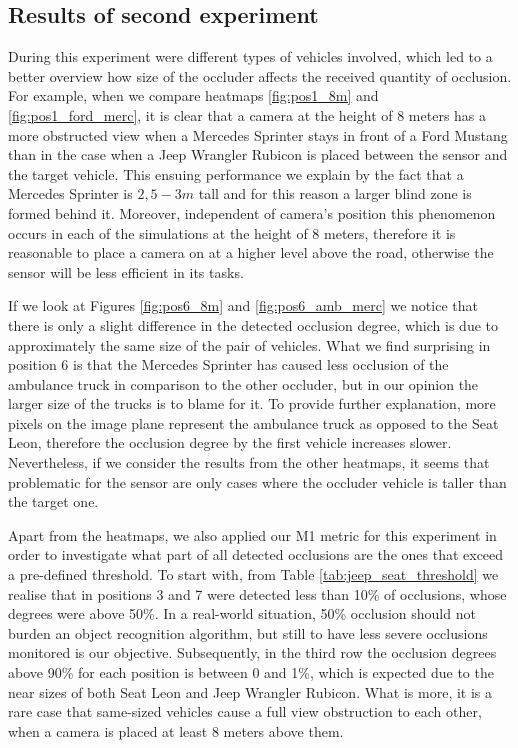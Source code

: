 \subsection{Results of second experiment}
During this experiment were different types of vehicles involved, which led to a better overview how size of the occluder affects the received quantity of occlusion. For example, when we compare heatmaps \ref{fig:pos1_8m} and \ref{fig:pos1_ford_merc}, it is clear that a camera at the height of 8 meters has a more obstructed view when a Mercedes Sprinter stays in front of a Ford Mustang than in the case when a Jeep Wrangler Rubicon is placed between the sensor and the target vehicle. This ensuing performance we explain by the fact that a Mercedes Sprinter is $2,5-3 m$ tall and for this reason a larger blind zone is formed behind it. Moreover, independent of camera's position this phenomenon occurs in each of the simulations at the height of 8 meters, therefore it is reasonable to place a camera on at a higher level above the road, otherwise the sensor will be less efficient in its tasks.

If we look at Figures \ref{fig:pos6_8m} and \ref{fig:pos6_amb_merc} we notice that there is only a slight difference in the detected occlusion degree, which is due to approximately the same size of the pair of vehicles. What we find surprising in position 6 is that the Mercedes Sprinter has caused less occlusion of the ambulance truck in comparison to the other occluder, but in our opinion the larger size of the trucks is to blame for it. To provide further explanation, more pixels on the image plane represent the ambulance truck as opposed to the Seat Leon, therefore the occlusion degree by the first vehicle increases slower. Nevertheless, if we consider the results from the other heatmaps, it seems that problematic for the sensor are only cases where the occluder vehicle is taller than the target one.

Apart from the heatmaps, we also applied our M1 metric for this experiment in order to investigate what part of all detected occlusions are the ones that exceed a pre-defined threshold. To start with, from Table \ref{tab:jeep_seat_threshold} we realise that in positions 3 and 7 were detected less than 10\% of occlusions, whose degrees were above 50\%. In a real-world situation, 50\% occlusion should not burden an object recognition algorithm, but still to have less severe occlusions monitored is our objective. Subsequently, in the third row the occlusion degrees above 90\% for each position is between 0 and 1\%, which is expected due to the near sizes of both Seat Leon and Jeep Wrangler Rubicon. What is more, it is a rare case that same-sized vehicles cause a full view obstruction to each other, when a camera is placed at least 8 meters above them.

